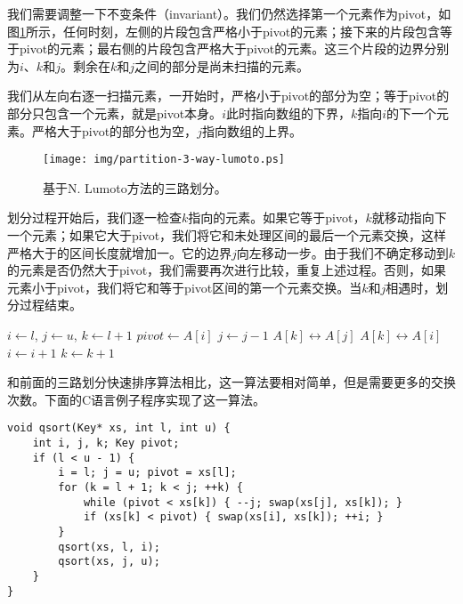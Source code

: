 \documentclass[UTF8]{article}
\begin{document}
我们需要调整一下不变条件（invariant）。我们仍然选择第一个元素作为pivot，如图\ref{fig:partition-3-way-lumoto}所示，任何时刻，左侧的片段包含严格小于pivot的元素；接下来的片段包含等于pivot的元素；最右侧的片段包含严格大于pivot的元素。这三个片段的边界分别为$i$、$k$和$j$。剩余在$k$和$j$之间的部分是尚未扫描的元素。

我们从左向右逐一扫描元素，一开始时，严格小于pivot的部分为空；等于pivot的部分只包含一个元素，就是pivot本身。$i$此时指向数组的下界，$k$指向$i$的下一个元素。严格大于pivot的部分也为空，$j$指向数组的上界。

\begin{figure}[htbp]
   \centering
   \texttt{[image: img/partition-3-way-lumoto.ps]}
   \caption{基于N. Lumoto方法的三路划分。}
   \label{fig:partition-3-way-lumoto}
\end{figure}

划分过程开始后，我们逐一检查$k$指向的元素。如果它等于pivot，$k$就移动指向下一个元素；如果它大于pivot，我们将它和未处理区间的最后一个元素交换，这样严格大于的区间长度就增加一。它的边界$j$向左移动一步。由于我们不确定移动到$k$的元素是否仍然大于pivot，我们需要再次进行比较，重复上述过程。否则，如果元素小于pivot，我们将它和等于pivot区间的第一个元素交换。当$k$和$j$相遇时，划分过程结束。

\begin{algorithmic}[1]
    \State $i \gets l$, $j \gets u$, $k \gets l + 1$
    \State $pivot \gets A[i]$
        \State $j \gets j - 1$
        \State {} $A[k] \leftrightarrow A[j]$
      \EndWhile
        \State {} $A[k] \leftrightarrow A[i]$
        \State $i \gets i + 1$
      \EndIf
      \State $k \gets k + 1$
    \EndWhile
    \State {}
    \State {}
  \EndIf
\EndProcedure
\end{algorithmic}

和前面的三路划分快速排序算法相比，这一算法要相对简单，但是需要更多的交换次数。下面的C语言例子程序实现了这一算法。

\lstset{language=C}
\begin{lstlisting}
void qsort(Key* xs, int l, int u) {
    int i, j, k; Key pivot;
    if (l < u - 1) {
        i = l; j = u; pivot = xs[l];
        for (k = l + 1; k < j; ++k) {
            while (pivot < xs[k]) { --j; swap(xs[j], xs[k]); }
            if (xs[k] < pivot) { swap(xs[i], xs[k]); ++i; }
        }
        qsort(xs, l, i);
        qsort(xs, j, u);
    }
}
\end{lstlisting}
\end{document}
